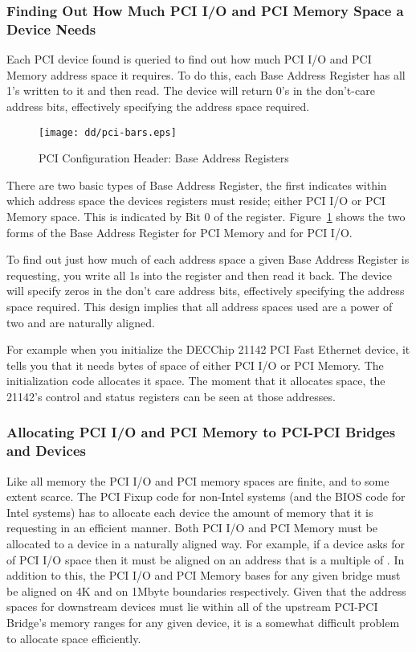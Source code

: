 \subsubsection{Finding Out How Much PCI I/O and PCI Memory Space a 
Device Needs}
Each PCI device found is queried to find out how much PCI 
I/O and PCI Memory address space it requires.   
To do 
this, each Base Address Register has all 1's written to 
it and then read.   
The device will return 0's in the 
don't-care address bits, effectively specifying the 
address space required.  

\begin{figure}
\begin{center}
{\centering \texttt{[image: dd/pci-bars.eps]} \par}
\end{center}
\caption{PCI Configuration Header: Base Address Registers}
\label{pci-bars}
\end{figure}
There are two basic types of Base Address Register, the 
first indicates within which address space the devices 
registers must reside; either PCI I/O or PCI Memory 
space.   This is indicated by Bit 0 of the register.
Figure~\ref{pci-bars} shows the two forms of the Base Address Register for 
PCI Memory and for PCI I/O.

To find out just how much of each address space a given 
Base Address Register is requesting, you write all 1s 
into the register and then read it back.   The device 
will specify zeros in the don't care address bits, 
effectively specifying the address space required.   
This design implies that all address spaces used are a power 
of two and are naturally aligned.

For example when you initialize the DECChip 21142 PCI Fast Ethernet 
device, it tells you that it needs  bytes of 
space of either PCI I/O or PCI Memory.   The 
initialization code allocates it space.   The moment that 
it allocates space, the 21142's control and status registers 
can be seen at those addresses.   


\subsubsection{Allocating PCI I/O and PCI Memory to PCI-PCI Bridges and 
Devices}
Like all memory the PCI I/O and PCI memory spaces are finite, and to some
extent scarce.
The PCI Fixup code for non-Intel systems (and the BIOS code for Intel
systems) has to allocate each device the amount of memory that it is
requesting in an efficient manner.
Both PCI I/O and PCI Memory  must be allocated to a  device in a naturally 
aligned way.   For example, if a device asks for  of PCI I/O space 
then it must be aligned on an address that is a multiple of .   
In addition to this, the PCI I/O and PCI Memory bases for 
any given bridge must be aligned on 4K and on 1Mbyte 
boundaries respectively.   
Given that the address spaces 
for downstream devices must lie within all of the 
upstream PCI-PCI Bridge's memory ranges for any given 
device, it is a somewhat difficult problem to allocate 
space efficiently.

